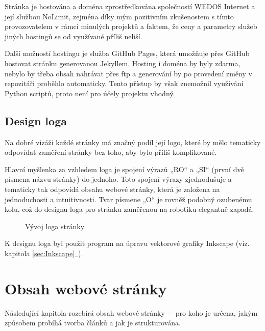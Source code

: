 \documentclass[a4paper, 12pt]{article}
\newcommand*{\fullref}[1]{\hyperref[{#1}]{\ref*{#1}~\nameref*{#1}}}
\begin{document}
  Stránka je hostována a doména zprostředkována společností WEDOS Internet a její službou NoLimit, zejména díky mým pozitivním zkušenostem s tímto provozovatelem v rámci minulých projektů a faktem, že ceny a parametry služeb jiných hostingů se od využívané příliš neliší.

  Další možností hostingu je služba GitHub Pages, která umožňuje přes GitHub hostovat stránku generovanou Jekyllem. Hosting i doména by byly zdarma, nebylo by třeba obsah nahrávat přes \acrshort{ftp} a generování by po provedení změny v repozitáři proběhlo automaticky. Tento přístup by však znemožnil využívání Python scriptů, proto není pro účely projektu vhodný.


  \subsection{Design loga}
  Na dobré vizáži každé stránky má značný podíl její logo, které by mělo tematicky odpovídat zaměření stránky bez toho, aby bylo příliš komplikované.

  Hlavní myšlenka za vzhledem loga je spojení výrazů „RO“ a „SI“ (první dvě písmena názvu stránky) do jednoho. Toto spojení výrazy zjednodušuje a tematicky tak odpovídá obsahu webové stránky, která je založena na jednoduchosti a intuitivnosti. Tvar písmene „O“ je rovněž podobný ozubenému kolu, což do designu loga pro stránku zaměřenou na robotiku elegantně zapadá.

  \begin{figure}[H]%
    \centering

    \hfill
    \hfill

    \caption{Vývoj loga stránky}%
    \label{img:Vývoj loga stránky}%
  \end{figure}

  K designu loga byl použit program na úpravu vektorové grafiky Inkscape (viz. kapitola \fullref{sec:Inkscape}).


  \section{Obsah webové stránky}
  Následující kapitola rozebírá obsah webové stránky~--~pro koho je určena, jakým způsobem probíhá tvorba článků a jak je strukturována.
\end{document}
